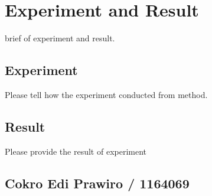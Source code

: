 \chapter{Experiment and Result}
brief of experiment and result.
\section{Experiment}
Please tell how the experiment conducted from method.

\section{Result}
Please provide the result of experiment

\section{Cokro Edi Prawiro / 1164069}


